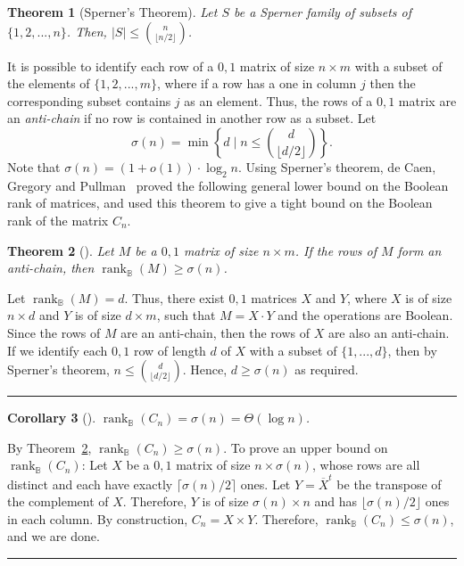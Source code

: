 \documentclass[11pt]{article}
\newtheorem{theorem}{Theorem}
\newtheorem{corollary}[theorem]{Corollary}
\newcommand{\qedsymb}{\hfill{\rule{2mm}{2mm}}}
\renewenvironment{proof}[1][]{\begin{trivlist}
\item[\hspace{\labelsep}{\bf\noindent Proof#1:\/}] }{\qedsymb\end{trivlist}}
\newcommand{\rank}{\mathop{\mathrm{rank}}}
\newcommand{\Rbool}{{\rank}_\mathbb{B}}
\begin{document}
\begin{theorem}[Sperner's Theorem]
\label{thm:sperner}
Let $S$ be a Sperner family of subsets of $\{1,2,...,n\}$. Then, $|S| \leq {n \choose \lfloor n/2\rfloor}$.
\end{theorem}

It is possible to identify each row of a $0,1$ matrix of size $n \times m$ with a subset of the elements of $\{1,2,...,m\}$,
where if a row has a one in column $j$ then the corresponding subset contains $j$ as an element.
Thus, the rows of a $0,1$ matrix are an {\em anti-chain} if no row is  contained in another row as a subset. Let
$$\sigma(n) = \min \left\{d\;|\; n \leq {d \choose \lfloor d/2\rfloor}\right\}.$$
Note that $\sigma(n) = (1+o(1)) \cdot \log_2 n$.
Using Sperner's theorem, de Caen, Gregory and Pullman~\cite{Caen2} proved the following general lower bound on the Boolean rank of matrices,
and used this theorem to give a tight bound on the Boolean rank of the matrix $C_n$.


\begin{theorem}[\cite{Caen2}]
\label{thm:caen}
Let $M$ be a $0,1$ matrix of size $n \times m$. If the rows of  $M$ form an anti-chain, then $\Rbool(M) \geq \sigma(n)$.
\end{theorem}
\begin{proof}
Let $\Rbool(M) = d$. Thus, there exist $0,1$ matrices $X$ and $Y$, where $X$ is of size $n \times d$ and $Y$ is of size $d \times m$, such that $M = X\cdot Y$
and the operations are Boolean.
Since the rows of $M$ are an anti-chain, then the rows of $X$ are also an anti-chain. If we identify each $0,1$ row of length $d$ of $X$ with a subset of $\{1,...,d\}$,
then by Sperner's theorem, $n \leq {d \choose \lfloor d/2\rfloor}$. Hence, $d \geq \sigma(n)$ as required.
\end{proof}

\begin{corollary}[\cite{Caen2}]
\label{coro-Cn}
$\Rbool(C_n) = \sigma(n) = \Theta(\log n)$.
\end{corollary}
\begin{proof}
By Theorem~\ref{thm:caen},  $\Rbool(C_n) \geq \sigma(n)$. To prove an upper bound on $\Rbool(C_n)$: Let $X$ be a $0,1$ matrix of size $n \times \sigma(n)$,
whose rows are all distinct and each have exactly $\lceil \sigma(n)/2 \rceil$ ones. Let $Y  = \overline{X}^t$ be the transpose of the complement of $X$.
Therefore, $Y$ is of size $\sigma(n) \times n$ and has $\lfloor \sigma(n)/2 \rfloor$ ones in each column.
By construction, $C_n = X \times Y$. Therefore, $\Rbool(C_n) \leq \sigma(n)$, and we are done.
\end{proof}
\end{document}

